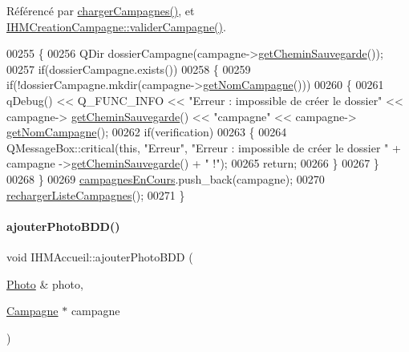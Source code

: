Référencé par \hyperlink{ihmaccueil_8cpp_source_l00130}{charger\+Campagnes()}, et \hyperlink{ihmcreationcampagne_8cpp_source_l00071}{I\+H\+M\+Creation\+Campagne\+::valider\+Campagne()}.


\begin{DoxyCode}
00255 \{
00256     QDir dossierCampagne(campagne->\hyperlink{class_campagne_ad752790357417d83a93056d9c9689a16}{getCheminSauvegarde}());
00257     \textcolor{keywordflow}{if}(dossierCampagne.exists())
00258     \{
00259         \textcolor{keywordflow}{if}(!dossierCampagne.mkdir(campagne->\hyperlink{class_campagne_a99a682fcb8e5a3f8c2aff7a44eb2c930}{getNomCampagne}()))
00260         \{
00261             qDebug() << Q\_FUNC\_INFO << \textcolor{stringliteral}{"Erreur : impossible de créer le dossier"} << campagne->
      \hyperlink{class_campagne_ad752790357417d83a93056d9c9689a16}{getCheminSauvegarde}() << \textcolor{stringliteral}{"campagne"} << campagne->
      \hyperlink{class_campagne_a99a682fcb8e5a3f8c2aff7a44eb2c930}{getNomCampagne}();
00262             \textcolor{keywordflow}{if}(verification)
00263             \{
00264                 QMessageBox::critical(\textcolor{keyword}{this}, \textcolor{stringliteral}{"Erreur"}, \textcolor{stringliteral}{"Erreur : impossible de créer le dossier "} + campagne
      ->\hyperlink{class_campagne_ad752790357417d83a93056d9c9689a16}{getCheminSauvegarde}() + \textcolor{stringliteral}{" !"});
00265                 \textcolor{keywordflow}{return};
00266             \}
00267         \}
00268     \}
00269     \hyperlink{class_i_h_m_accueil_ad3827b81480eb201b5927c16a2ad1c46}{campagnesEnCours}.push\_back(campagne);
00270     \hyperlink{class_i_h_m_accueil_a44074f2d8d59e0d1b7a3d50c24d2a0df}{rechargerListeCampagnes}();
00271 \}
\end{DoxyCode}
\mbox{\label{class_i_h_m_accueil_aa27c7334efe44c8c4cd582df6581fdff}} 
\paragraph{\texorpdfstring{ajouter\+Photo\+B\+D\+D()}{ajouterPhotoBDD()}}
{\footnotesize\ttfamily void I\+H\+M\+Accueil\+::ajouter\+Photo\+B\+DD (\begin{DoxyParamCaption}\item[{\hyperlink{struct_photo}{Photo} \&}]{photo,  }\item[{\hyperlink{class_campagne}{Campagne} $\ast$}]{campagne }\end{DoxyParamCaption})}



